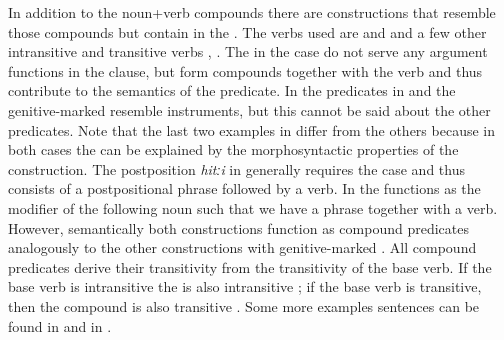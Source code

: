 In addition to the noun+verb compounds there are constructions that resemble those compounds but contain  in the . The verbs used are   and   and a few other intransitive and transitive verbs ,  . The  in the  case do not serve any argument functions in the clause, but form compounds together with the verb and thus contribute to the semantics of the predicate. In the predicates in  and  the genitive-marked  resemble instruments, but this cannot be said about the other predicates. Note that the last two examples in  differ from the others because in both cases the  can be explained by the morphosyntactic properties of the construction. The postposition \textit{hitːi} in  generally requires the  case and thus  consists of a postpositional phrase followed by a verb. In  the  functions as the modifier of the following noun such that we have a  phrase together with a verb. However, semantically both constructions function as compound predicates analogously to the other constructions with genitive-marked . All compound predicates derive their transitivity from the transitivity of the base verb. If the base verb is intransitive the  is also intransitive  ; if the base verb is transitive, then the compound is also transitive . Some more examples sentences can be found in  and in . 


